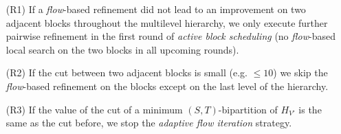\begin{enumerate}
\item[(R1)] If a \emph{flow}-based refinement did not lead to an improvement on two adjacent blocks 
            throughout the multilevel hierarchy, we only execute further pairwise refinement in
            the first round of \emph{active block scheduling} (no \emph{flow}-based local search on the
            two blocks in all upcoming rounds).
\item[(R2)] If the cut between two adjacent blocks is small (e.g. $\le 10$) we
            skip the \emph{flow}-based refinement on the blocks except on the last level of the hierarchy.
\item[(R3)] If the value of the cut of a minimum $(S,T)$-bipartition of $H_{V'}$ is the same 
            as the cut before, we stop the \emph{adaptive flow iteration} strategy.
\end{enumerate}


